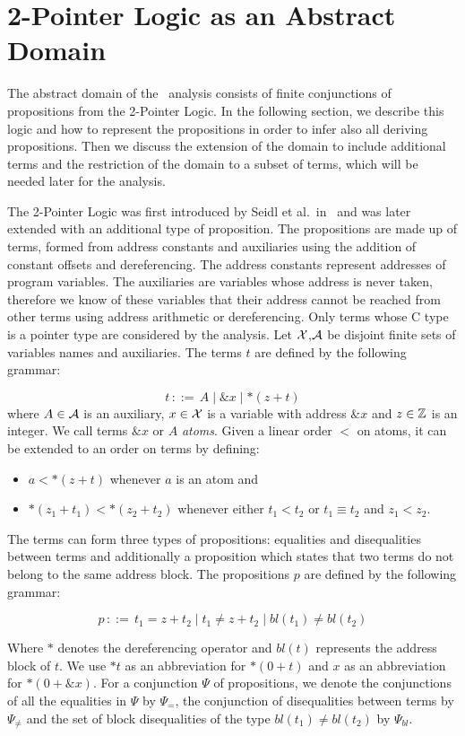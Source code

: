 \chapter{2-Pointer Logic as an Abstract Domain}\label{chapter:2pointer}

The abstract domain of the \cpo\ analysis consists of finite conjunctions of propositions from the 2-Pointer Logic.
In the following section, we describe this logic and how to represent the propositions in order to
infer also all deriving propositions.
Then we discuss the extension of the domain to include additional terms and the restriction of the domain to a subset of terms,
which will be needed later for the analysis.

The 2-Pointer Logic was first introduced by Seidl et al.\ in~\cite{2pointer} and was later extended with an additional type of proposition.
The propositions are made up of terms, formed from address constants and auxiliaries using the addition of constant offsets and dereferencing.
The address constants represent addresses of program variables.
The auxiliaries are variables whose address is never taken, therefore
we know of these variables that their address cannot be reached from other terms using address arithmetic or dereferencing.
Only terms whose C type is a pointer type are considered by the analysis.
Let $\mathcal{X}$,$\mathcal{A}$ be disjoint finite sets of variables names and auxiliaries.
The terms $t$ are defined by the following grammar:

\[
    t\,{::=}\,A \mid \&x \mid *(z+t)
\]
where $A\in \mathcal{A}$ is an auxiliary, $x \in \mathcal{X}$ is a variable with address $\&x$ and $z \in \mathbb{Z}$ is an integer.
We call terms $\&x$ or $A$ \emph{atoms}.
Given a linear order $<$ on atoms, it can be extended to an order on terms by defining:
\begin{itemize}
    \item $a < *(z+t)$ whenever $a$ is an atom and
    \item $*(z_1 + t_1) < *(z_2 + t_2)$ whenever either $t_1 < t_2$ or $t_1 \equiv t_2$ and $z_1 < z_2$.
\end{itemize}

The terms can form three types of propositions: equalities and disequalities between terms and additionally a proposition which states that two terms do not belong to the same address block.
The propositions $p$ are defined by the following grammar:

\[
    p\,{::=}\,t_1=z+t_2 \mid t_1\neq z+t_2\mid bl(t_1) \neq bl(t_2)
\]

Where $*$ denotes the dereferencing operator and $bl(t)$ represents the address block of $t$.
We use $*t$ as an abbreviation for $*(0+t)$ and $x$ as an abbreviation for $*(0+\&x)$.
For a conjunction $\Psi$ of propositions, we denote the conjunctions of all the equalities in $\Psi$ by $\Psi_{=}$, the conjunction of disequalities between terms by $\Psi_{\neq}$ and the set of block disequalities of the type $bl(t_1) \neq bl(t_2)$ by $\Psi_{bl}$.



